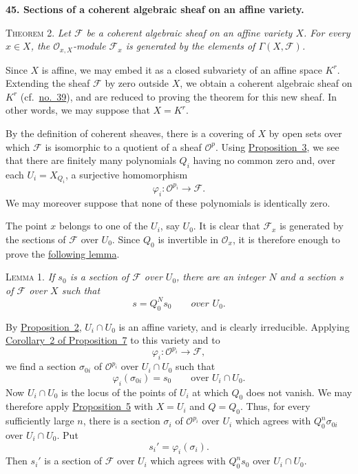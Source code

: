 
\medskip
{}\label{fac:II:3:no:45}
\textbf{45. Sections of a coherent algebraic sheaf on an affine variety.}

\label{fac:II:3:no:45:thm:2}
\textsc{Theorem 2.} \textit{Let $\mathcal{F}$ be a coherent algebraic sheaf on an affine variety $X$. For every $x\in X$, the $\mathcal{O}_{x,X}$-module $\mathcal{F}_x$ is generated by the elements of $\Gamma(X,\mathcal{F})$.}

Since $X$ is affine, we may embed it as a closed subvariety of an affine space $K^r$. Extending the sheaf $\mathcal{F}$ by zero outside $X$, we obtain a coherent algebraic sheaf on $K^r$ (cf.~\hyperref[fac:II:2:no:39]{no.~39}), and are reduced to proving the theorem for this new sheaf. In other words, we may suppose that $X=K^r$.

By the definition of coherent sheaves, there is a covering of $X$ by open sets over which $\mathcal{F}$ is isomorphic to a quotient of a sheaf $\mathcal{O}^p$. Using \hyperref[fac:II:3:no:42:prop:3]{Proposition~3}, we see that there are finitely many polynomials $Q_i$ having no common zero and, over each $U_i=X_{Q_i}$, a surjective homomorphism
\[
\varphi_i:\mathcal{O}^{p_i}\longrightarrow\mathcal{F}.
\]
We may moreover suppose that none of these polynomials is identically zero.

The point $x$ belongs to one of the $U_i$, say $U_0$. It is clear that $\mathcal{F}_x$ is generated by the sections of $\mathcal{F}$ over $U_0$. Since $Q_0$ is invertible in $\mathcal{O}_x$, it is therefore enough to prove the \hyperref[fac:II:3:no:45:lemma:1]{following lemma}.

\label{fac:II:3:no:45:lemma:1}
\textsc{Lemma 1.} \textit{If $s_0$ is a section of $\mathcal{F}$ over $U_0$, there are an integer $N$ and a section $s$ of $\mathcal{F}$ over $X$ such that}
\[
s=Q_0^N s_0
\qquad\textit{over $U_0$.}
\]

By \hyperref[fac:II:3:no:42:prop:2]{Proposition~2}, $U_i\cap U_0$ is an affine variety, and is clearly irreducible. Applying \hyperref[fac:II:3:no:44:prop:7:cor:2]{Corollary~2 of Proposition~7} to this variety and to
\[
\varphi_i:\mathcal{O}^{p_i}\longrightarrow\mathcal{F},
\]
we find a section $\sigma_{0i}$ of $\mathcal{O}^{p_i}$ over $U_i\cap U_0$ such that
\[
\varphi_i(\sigma_{0i})=s_0
\qquad\text{over }U_i\cap U_0.
\]
Now $U_i\cap U_0$ is the locus of the points of $U_i$ at which $Q_0$ does not vanish. We may therefore apply \hyperref[fac:II:3:no:43:prop:5]{Proposition~5} with $X=U_i$ and $Q=Q_0$. Thus, for every sufficiently large $n$, there is a section $\sigma_i$ of $\mathcal{O}^{p_i}$ over $U_i$ which agrees with $Q_0^n\sigma_{0i}$ over $U_i\cap U_0$. Put
\[
s_i'=\varphi_i(\sigma_i).
\]
Then $s_i'$ is a section of $\mathcal{F}$ over $U_i$ which agrees with $Q_0^n s_0$ over $U_i\cap U_0$.

